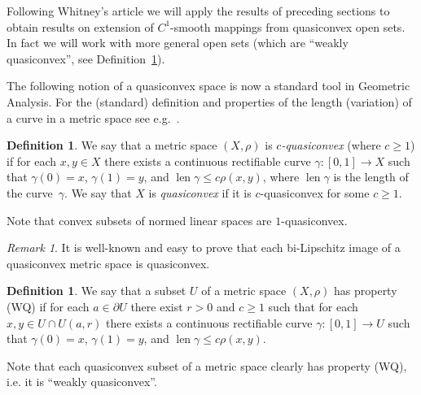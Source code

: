 \documentclass[a4paper,twoside,10pt,reqno,draft]{amsart}
\theoremstyle{definition}
\newtheorem{definition}[theorem]{Definition}
\theoremstyle{remark}
\newtheorem{remark}[theorem]{Remark}
\newcommand\ga{\gamma}
\newcommand\bdry{\partial}
\DeclareMathOperator{\len}{len}
\newcommand\pWQ{(WQ)}
\begin{document}
Following Whitney's article \cite{Wh2} we will apply the results of preceding sections to obtain results on extension of $C^1$-smooth mappings from quasiconvex open sets.
In fact we will work with more general open sets (which are ``weakly quasiconvex'', see Definition~\ref{d:WQ}).

The following notion of a quasiconvex space is now a standard tool in Geometric Analysis.
For the (standard) definition and properties of the length (variation) of a curve in a metric space see e.g.~\cite{Ch}.

\begin{definition}
We say that a metric space $(X,\rho)$ is \emph{$c$-quasiconvex} (where $c\ge1$) if for each $x,y\in X$ there exists a continuous rectifiable curve $\ga\colon[0,1]\to X$ such that
$\ga(0)=x$, $\ga(1)=y$, and $\len\ga\le c\rho(x,y)$, where $\len\ga$ is the length of the curve~$\ga$.
We say that $X$ is \emph{quasiconvex} if it is $c$-quasiconvex for some $c\ge1$.
\end{definition}

Note that convex subsets of normed linear spaces are $1$-quasiconvex.

\begin{remark}\label{r:biLip-quasic}
It is well-known and easy to prove that each bi-Lipschitz image of a quasiconvex metric space is quasiconvex.
\end{remark}

\begin{definition}\label{d:WQ}
We say that a subset $U$ of a metric space $(X,\rho)$ has property {\pWQ}
if for each $a\in\bdry U$ there exist $r>0$ and $c\ge1$ such that for each $x,y\in U\cap U(a,r)$ there exists a continuous rectifiable curve $\ga\colon[0,1]\to U$ such that
$\ga(0)=x$, $\ga(1)=y$, and $\len\ga\le c\rho(x,y)$.
\end{definition}

Note that each quasiconvex subset of a metric space clearly has property \pWQ, i.e. it is ``weakly quasiconvex''.
\end{document}
